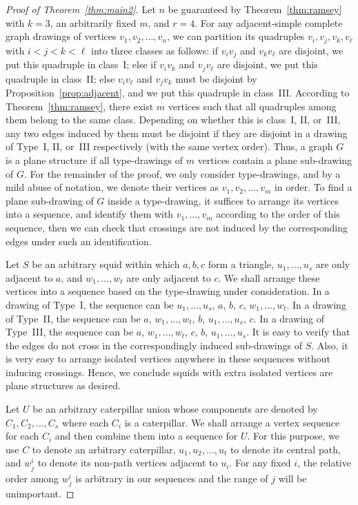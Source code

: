 \documentclass[a4paper,UKenglish,cleveref, autoref, thm-restate]{lipics_arxiv}
\begin{document}
\begin{proof}[Proof of Theorem~\ref{thm:main2}]

    Let $n$ be guaranteed by Theorem~\ref{thm:ramsey} with $k=3$, an arbitrarily fixed $m$, and $r=4$. For any adjacent-simple complete graph drawings of vertices $v_1,v_2,\dots,v_n$, we can partition its quadruples $v_i,v_j,v_k,v_\ell$ with $i<j<k<\ell$ into three classes as follows: if $v_iv_j$ and $v_kv_\ell$ are disjoint, we put this quadruple in class~I; else if $v_iv_k$ and $v_jv_\ell$ are disjoint, we put this quadruple in class~II; else $v_iv_\ell$ and $v_jv_k$ must be disjoint by Proposition~\ref{prop:adjacent}, and we put this quadruple in class~III. According to Theorem~\ref{thm:ramsey}, there exist $m$ vertices such that all quadruples among them belong to the same class. Depending on whether this is class~I, II, or~III, any two edges induced by them must be disjoint if they are disjoint in a drawing of Type~I, II, or~III respectively (with the same vertex order). Thus, a graph $G$ is a plane structure if all type-drawings of $m$ vertices contain a plane sub-drawing of $G$. For the remainder of the proof, we only consider type-drawings, and by a mild abuse of notation, we denote their vertices as $v_1,v_2,\dots,v_m$ in order. To find a plane sub-drawing of $G$ inside a type-drawing, it suffices to arrange its vertices into a sequence, and identify them with $v_1,\dots,v_m$ according to the order of this sequence, then we can check that crossings are not induced by the corresponding edges under such an identification.

    Let $S$ be an arbitrary squid within which $a,b,c$ form a triangle, $u_1,\dots,u_s$ are only adjacent to $a$, and $w_1,\dots,w_t$ are only adjacent to $c$. We shall arrange these vertices into a sequence based on the type-drawing under consideration. In a drawing of Type~I, the sequence can be $u_1,\dots,u_s$, $a$, $b$, $c$, $w_1,\dots,w_t$. In a drawing of Type~II, the sequence can be $a$, $w_1,\dots,w_t$, $b$, $u_1,\dots,u_s$, $c$. In a drawing of Type~III, the sequence can be $a$, $w_1,\dots,w_t$, $c$, $b$, $u_1,\dots,u_s$. It is easy to verify that the edges do not cross in the correspondingly induced sub-drawings of $S$. Also, it is very easy to arrange isolated vertices anywhere in these sequences without inducing crossings. Hence, we conclude squids with extra isolated vertices are plane structures as desired.

    Let $U$ be an arbitrary caterpillar union whose components are denoted by $C_1,C_2,\dots,C_s$ where each $C_i$ is a caterpillar. We shall arrange a vertex sequence for each $C_i$ and then combine them into a sequence for $U$. For this purpose, we use $C$ to denote an arbitrary caterpillar, $u_1,u_2,\dots,u_t$ to denote its central path, and $w^i_j$ to denote its non-path vertices adjacent to $u_i$. For any fixed $i$, the relative order among $w^i_j$ is arbitrary in our sequences and the range of $j$ will be unimportant.
    

\end{proof}
\end{document}
